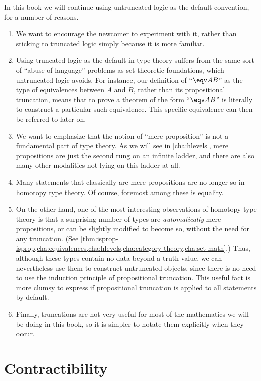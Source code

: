 In this book we will continue using untruncated logic as the default convention, for a number of reasons.
\begin{enumerate}[label=(\arabic*)]
\item We want to encourage the newcomer to experiment with it, rather than sticking to truncated logic simply because it is more familiar.
\item Using truncated logic as the default in type theory suffers from the same sort of ``abuse of language'' problems as set-theoretic foundations, which untruncated logic avoids.
  For instance, our definition of ``$\eqv A B$'' as the type of equivalences between $A$ and $B$, rather than its propositional truncation, means that to prove a theorem of the form ``$\eqv A B$'' is literally to construct a particular such equivalence.
  This specific equivalence can then be referred to later on.
\item We want to emphasize that the notion of ``mere proposition'' is not a fundamental part of type theory.
  As we will see in \cref{cha:hlevels}, mere propositions are just the second rung on an infinite ladder, and there are also many other modalities not lying on this ladder at all.
\item Many statements that classically are mere propositions are no longer so in homotopy type theory.
  Of course, foremost among these is equality.
\item On the other hand, one of the most interesting observations of homotopy type theory is that a surprising number of types are \emph{automatically} mere propositions, or can be slightly modified to become so, without the need for any truncation.
  (See \cref{thm:isprop-isprop,cha:equivalences,cha:hlevels,cha:category-theory,cha:set-math}.)
  Thus, although these types contain no data beyond a truth value, we can nevertheless use them to construct untruncated objects, since there is no need to use the induction principle of propositional truncation.
  This useful fact is more clumsy to express if propositional truncation is applied to all statements by default.
\item Finally, truncations are not very useful for most of the mathematics we will be doing in this book, so it is simpler to notate them explicitly when they occur.
\end{enumerate}

%
%

\section{Contractibility}
\label{sec:contractibility}


